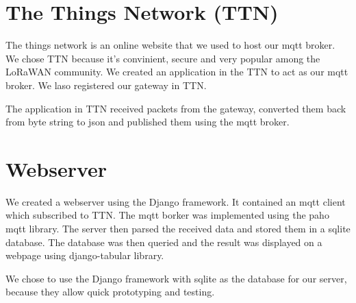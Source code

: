 \section{The Things Network (TTN)}
	The things network is an online website that we used to host our mqtt broker. We chose TTN because it's convinient, secure and very popular among the LoRaWAN community. We created an application in the TTN to act as our mqtt broker. We laso registered our gateway in TTN.

	The application in TTN received packets from the gateway, converted them back from byte string to json and published them using the mqtt broker.


\section{Webserver}
	We created a webserver using the Django framework. It contained an mqtt client which subscribed to TTN. The mqtt borker was implemented using the paho mqtt library. The server then parsed the received data and stored them in a sqlite database. The database was then queried and the result was displayed on a webpage using django-tabular library.

	We chose to use the Django framework with sqlite as the database for our server, because they allow quick prototyping and testing.

